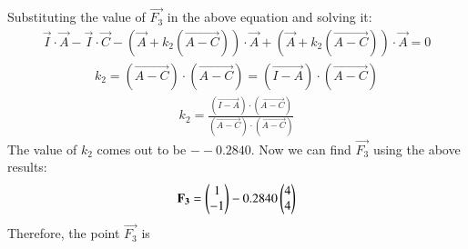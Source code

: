 \documentclass[journal,12pt,twocolumn]{IEEEtran}
\theoremstyle{remark}
\begin{document}
Substituting the value of $\vec{F_3}$ in the above equation and solving it:
\begin{align}
\vec{I}\cdot\vec{A}-\vec{I}\cdot\vec{C}-(\vec{A}+k_2(\vec{A-C}))\cdot\vec{A}+(\vec{A}+k_2(\vec{A-C}))\cdot\vec{A}=0 
\end{align}
\begin{align}
k_2=(\vec{A-C})\cdot(\vec{A-C})=(\vec{I-A})\cdot(\vec{A-C})
\end{align}
\begin{align}
k_2=\frac{(\vec{I-A})\cdot(\vec{A-C})}{(\vec{A-C})\cdot(\vec{A-C})}
\end{align}
The value of $k_2$ comes out to be $--0.2840$.
Now we can find $\vec{F_3}$ using the above results:
\begin{align}
\mathbf{F_3}=\begin{pmatrix}1\\-1\end{pmatrix}-0.2840\begin{pmatrix}4\\4\end{pmatrix}
\end{align}
Therefore, the point $\vec{F_3}$ is
\end{document}
